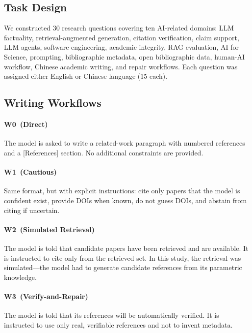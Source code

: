 \documentclass[11pt,a4paper]{article}
\newcommand{\wzero}{W0~}
\newcommand{\wone}{W1~}
\newcommand{\wtwo}{W2~}
\newcommand{\wthree}{W3~}
\begin{document}
\subsection{Task Design}

We constructed 30 research questions covering ten AI-related domains: LLM factuality, retrieval-augmented generation, citation verification, claim support, LLM agents, software engineering, academic integrity, RAG evaluation, AI for Science, prompting, bibliographic metadata, open bibliographic data, human-AI workflow, Chinese academic writing, and repair workflows. Each question was assigned either English or Chinese language (15 each).

\subsection{Writing Workflows}

\paragraph{\wzero (Direct)} The model is asked to write a related-work paragraph with numbered references and a [References] section. No additional constraints are provided.

\paragraph{\wone (Cautious)} Same format, but with explicit instructions: cite only papers that the model is confident exist, provide DOIs when known, do not guess DOIs, and abstain from citing if uncertain.

\paragraph{\wtwo (Simulated Retrieval)} The model is told that candidate papers have been retrieved and are available. It is instructed to cite only from the retrieved set. In this study, the retrieval was simulated---the model had to generate candidate references from its parametric knowledge.

\paragraph{\wthree (Verify-and-Repair)} The model is told that its references will be automatically verified. It is instructed to use only real, verifiable references and not to invent metadata.
\end{document}
